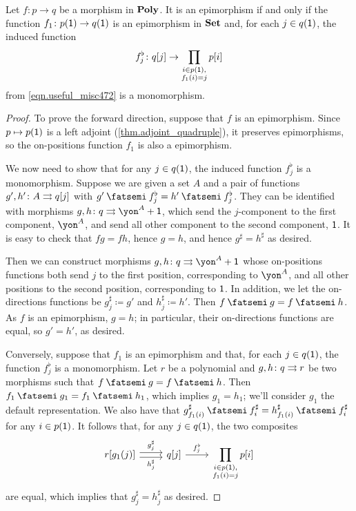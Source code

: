 \documentclass[Book-Poly]{subfiles}
\begin{document}
\begin{proposition}\label{prop.epis_in_poly}
Let $f \colon p \to q$ be a morphism in $\mathbf{Poly}$. It is an epimorphism if and only if the function $f_1 \colon p(\textsf{1}) \to q(\textsf{1})$ is an epimorphism in $\mathbf{Set}$ and, for each $j\in q(\textsf{1})$, the induced function
\[
    f^\flat_j \colon q[j] \to \prod_{\substack{i\in p(\textsf{1}), \\ f_1(i)=j}} p[i]
\]
from \eqref{eqn.useful_misc472} is a monomorphism.
\end{proposition}
\begin{proof}
To prove the forward direction, suppose that $f$ is an epimorphism. Since $p \mapsto p(\textsf{1})$ is a left adjoint (\cref{thm.adjoint_quadruple}), it preserves epimorphisms, so the on-positions function $f_1$ is also a epimorphism.

We now need to show that for any $j\in q(\textsf{1})$, the induced function $f^\flat_j$ is a monomorphism.
Suppose we are given a set $A$ and a pair of functions $g',h'\colon A\rightrightarrows q[j]$ with $g' \then f^\flat_j = h' \then f^\flat_j$.
They can be identified with morphisms $g,h\colon q\tto \yon^A+\1$, which send the $j$-component to the first component, $\yon^A$, and send all other component to the second component, $\textsf{1}$. It is easy to check that $fg=fh$, hence $g=h$, and hence $g^\sharp=h^\sharp$ as desired.

Then we can construct morphisms $g,h \colon q \tto \yon^A+\1$ whose on-positions functions both send $j$ to the first position, corresponding to $\yon^A$, and all other positions to the second position, corresponding to $\textsf{1}$.
In addition, we let the on-directions functions be $g^\sharp_j \coloneqq g'$ and $h^\sharp_j \coloneqq h'$.
Then $f \then g = f \then h$.
As $f$ is an epimorphism, $g = h$; in particular, their on-directions functions are equal, so $g' = h'$, as desired.

Conversely, suppose that $f_1$ is an epimorphism and that, for each $j\in q(\textsf{1})$, the function $f^\flat_j$ is a monomorphism. 
Let $r$ be a polynomial and $g,h\colon q\rightrightarrows r$ be two morphisms such that $f \then g = f \then h$.
Then $f_1 \then g_1 = f_1 \then h_1$, which implies $g_1=h_1$; we'll consider $g_1$ the default representation.
We also have that $g^\sharp_{f_1(i)} \then f^\sharp_i = h^\sharp_{f_1(i)} \then f^\sharp_i$ for any $i\in p(\textsf{1})$.
It follows that, for any $j \in q(\textsf{1})$, the two composites
\[
\begin{tikzcd}
	r[g_1(j)] \ar[r, shift left, "g^\sharp_j"] \ar[r, shift right, "h^\sharp_j"'] & q[j] \ar[r, "f^\flat_j"] & \displaystyle\prod_{\substack{i\in p(\1), \\ f_1(i)=j}} p[i]
\end{tikzcd}
\]
are equal, which implies that $g^\sharp_j=h^\sharp_j$ as desired.
\end{proof}
\end{document}
